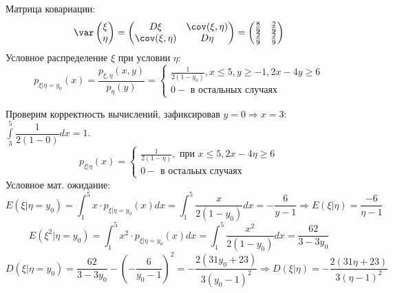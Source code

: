 \begin{enumerate}
	\begin{center}
		\qquad
	\end{center}
	Матрица ковариации:
	\[ \var \begin{pmatrix} \xi \\ \eta \end{pmatrix} = \begin{pmatrix} D\xi & \cov (\xi, \eta) \\ \cov (\xi, \eta) & D\eta \end{pmatrix} = \begin{pmatrix} \frac{8}{9} & \frac{2}{9} \\ \frac{2}{9} & \frac{2}{9} \end{pmatrix} \]
	Условное распределение $\xi$ при условии $\eta$:
	\[
	p_{\xi|\eta = y_0} (x) = \frac{p_{\xi, \eta}  (x,y)}{p_{\eta} (y)} =
	\begin{cases}
		\frac{1}{2(1-y_0)}, x \le 5, y \ge -1, 2x - 4y \ge 6 \\
		0 - \text{ в остальных случаях}
	\end{cases}
	\]
	\begin{center}
		\qquad
	\end{center}
	Проверим корректность вычислений, зафиксировав $y=0 \Rightarrow x = 3$: $\int\limits_{3}^{5} \dfrac{1}{2(1-0)}dx = 1$.
	\[
	p_{\xi | \eta} (x) =
	\begin{cases}
		\frac{1}{2(1-\eta)}, \text{ при } x \le 5, 2x - 4 \eta \ge 6 \\
		0 - \text{ в остальых случаях}
	\end{cases}
	\]
	Условное мат. ожидание:
	\[ E(\xi | \eta = y_0) = \int_{1}^{5} x \cdot p_{\xi | \eta = y_0} (x) dx = \int_{1}^{5} \frac{x}{2(1-y_0)} dx = -\frac{6}{y-1} \Rightarrow E(\xi|\eta) = \frac{-6}{\eta-1} \]
	\[ E(\xi^2 | \eta = y_0) = \int_{1}^{5} x^2 \cdot p_{\xi | \eta = y_0} (x) dx = \int_{1}^{5} \frac{x^2}{2(1-y_0)} dx = \frac{62}{3-3y_0} \]
	\[ D(\xi | \eta = y_0) = \frac{62}{3-3y_0} - \left( -\frac{6}{y_0-1} \right)^2 = -\frac{2(31y_0 + 23)}{3(y_0-1)^2} \Rightarrow D(\xi | \eta) = -\frac{2(31\eta + 23)}{3(\eta-1)^2} \]
	

\end{enumerate}
